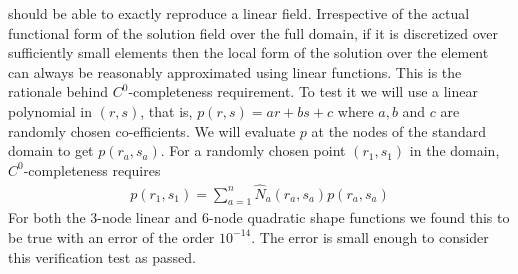 \documentclass[../main.tex]{subfiles}
\begin{document}
\begin{itemize}
  should be able to exactly reproduce a linear field. Irrespective of
  the actual functional form of the solution field over the full
  domain, if it is discretized over sufficiently small elements then
  the local form of the solution over the element can always be
  reasonably approximated using linear functions. This is the
  rationale behind $C^0$-completeness requirement. To test it we will
  use a linear polynomial in $(r,s)$, that is, $p(r,s) = ar+bs+c$ where
  $a,b$ and $c$ are randomly chosen co-efficients. We will evaluate
  $p$ at the nodes of the standard domain to get $p(r_a,s_a)$. For a
  randomly chosen point $(r_1,s_1)$ in the domain, $C^0$-completeness
  requires
  \begin{align*}
    p(r_1,s_1) = \sum_{a=1}^n\hat{N}_a(r_a,s_a)p(r_a,s_a)
  \end{align*}
  For both the 3-node linear and 6-node quadratic shape functions we
  found this to be true with an error of the order $10^{-14}$. The
  error is small enough to consider this verification test as passed.
\end{itemize}
\end{document}
